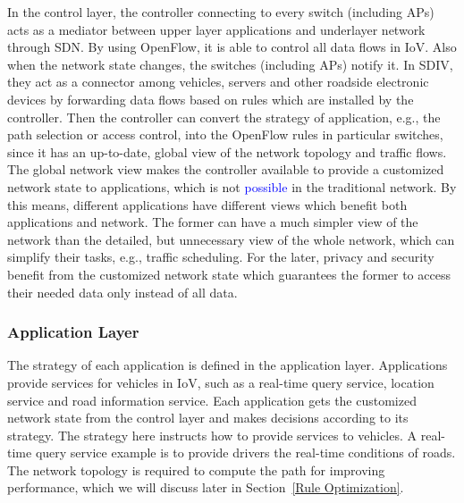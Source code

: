 \documentclass[journal]{IEEEtran}
\begin{document}
In the control layer, the controller connecting to every switch (including APs) acts as a mediator between upper layer applications and underlayer network through SDN. By using OpenFlow, it is able to control all data flows in IoV. Also when the network state changes, the switches (including APs) notify it. In SDIV, they act as a connector among vehicles, servers and other roadside electronic devices by forwarding data flows based on rules which are installed by the controller. Then the controller can convert the strategy of application, e.g., the path selection or access control, into the OpenFlow rules in particular switches, since it has an up-to-date, global view of the network topology and traffic flows. The global network view makes the controller available to provide a customized network state to applications, which is not \textcolor{blue}{possible} in the traditional network. By this means, different applications have different views which benefit both applications and network. The former can have a much simpler view of the network than the detailed, but unnecessary view of the whole network, which can simplify their tasks, e.g., traffic scheduling. For the later, privacy and security benefit from the customized network state which guarantees the former to access their needed data only instead of all data.

\subsubsection{Application Layer}

The strategy of each application is defined in the application layer. Applications provide services for vehicles in IoV, such as a real-time query service, location service and road information service. Each application gets the customized network state from the control layer and makes decisions according to its strategy. The strategy here instructs how to provide services to vehicles. A real-time query service example is to provide drivers the real-time conditions of roads. The network topology is required to compute the path for improving performance, which we will discuss later in Section~\ref{Rule Optimization}.
\end{document}

